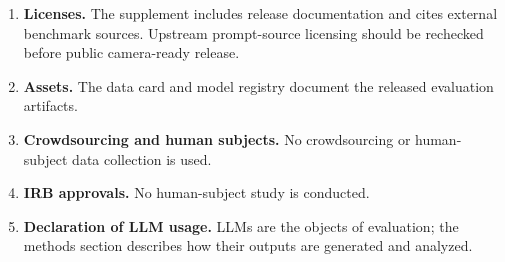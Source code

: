 \documentclass{article}
\begin{document}
\begin{enumerate}
    \item \textbf{Licenses.} \answerYes The supplement includes release documentation and cites external benchmark sources. Upstream prompt-source licensing should be rechecked before public camera-ready release.
    \item \textbf{Assets.} \answerYes The data card and model registry document the released evaluation artifacts.
    \item \textbf{Crowdsourcing and human subjects.} \answerNA No crowdsourcing or human-subject data collection is used.
    \item \textbf{IRB approvals.} \answerNA No human-subject study is conducted.
    \item \textbf{Declaration of LLM usage.} \answerYes LLMs are the objects of evaluation; the methods section describes how their outputs are generated and analyzed.
\end{enumerate}
\end{document}
